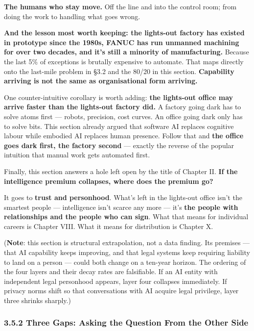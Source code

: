 \documentclass[11pt,a4paper]{article}
\begin{document}
\textbf{The humans who stay move.} Off the line and into the control room; from doing the work to handling what goes wrong.

\textbf{And the lesson most worth keeping: the lights-out factory has existed in prototype since the 1980s, FANUC has run unmanned machining for over two decades, and it's still a minority of manufacturing.} Because the last 5\% of exceptions is brutally expensive to automate. That maps directly onto the last-mile problem in \S{}3.2 and the 80/20 in this section. \textbf{Capability arriving is not the same as organisational form arriving.}

One counter-intuitive corollary is worth adding: \textbf{the lights-out office may arrive faster than the lights-out factory did.} A factory going dark has to solve atoms first --- robots, precision, cost curves. An office going dark only has to solve bits. This section already argued that software AI replaces cognitive labour while embodied AI replaces human presence. Follow that and \textbf{the office goes dark first, the factory second} --- exactly the reverse of the popular intuition that manual work gets automated first.

Finally, this section answers a hole left open by the title of Chapter II. \textbf{If the intelligence premium collapses, where does the premium go?}

It goes to \textbf{trust and personhood}. What's left in the lights-out office isn't the smartest people --- intelligence isn't scarce any more --- it's \textbf{the people with relationships and the people who can sign}. What that means for individual careers is Chapter VIII. What it means for distribution is Chapter X.

(\textbf{Note}: this section is structural extrapolation, not a data finding. Its premises --- that AI capability keeps improving, and that legal systems keep requiring liability to land on a person --- could both change on a ten-year horizon. The ordering of the four layers and their decay rates are falsifiable. If an AI entity with independent legal personhood appears, layer four collapses immediately. If privacy norms shift so that conversations with AI acquire legal privilege, layer three shrinks sharply.)

\subsubsection{3.5.2 Three Gaps: Asking the Question From the Other Side}
\end{document}
